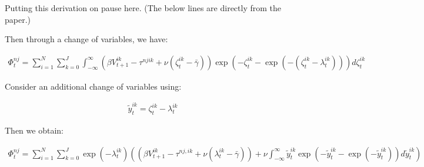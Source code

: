 \documentclass[10pt]{article}
\begin{document}
\begin{questions}[Break]
    Putting this derivation on pause here. (The below lines 
    are directly from the paper.)
\end{questions}

Then through a change of variables, we have:

\begin{align}
    \Phi_t^{n j}=\sum_{i=1}^N \sum_{k=0}^J \int_{-\infty}^{\infty}\left(\beta V_{t+1}^{i k}-\tau^{n j i k}+\nu\left(\zeta_t^{i k}-\bar{\gamma}\right)\right) \exp \left(-\zeta_t^{i k}-\exp \left(-\left(\zeta_t^{i k}-\lambda_t^{i k}\right)\right)\right) d \zeta_t^{i k}
\end{align}

Consider an additional change of variables using:

\begin{align}
    \tilde{y}_t^{i k}=\zeta_t^{i k}-\lambda_t^{i k}
\end{align}

Then we obtain:

\begin{align}
    \Phi_t^{n j}=\sum_{i=1}^N \sum_{k=0}^J \exp \left(-\lambda_t^{i k}\right) \left(\left(\beta V_{t+1}^{i k}-\tau^{n j, i k}+\nu\left(\lambda_t^{i k}-\bar{\gamma}\right)\right)+\nu \int_{-\infty}^{\infty} \tilde{y}_t^{i k} \exp \left(-\tilde{y}_t^{i k}-\exp \left(-\tilde{y}_t^{i k}\right)\right) d \tilde{y}_t^{i k}\right)
\end{align}
\end{document}
